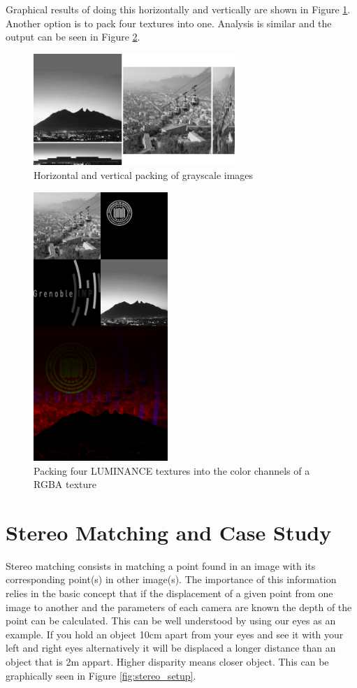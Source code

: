 \documentclass[conference]{IEEEtran}
\begin{document}
\begin{itemize}
Graphical results of doing this horizontally and vertically are shown in Figure \ref{fig:hor_ver_packing}. Another option is to pack four textures into one. Analysis is similar and the output can be seen in Figure \ref{fig:gray2color_packing}.
\end{itemize}

\begin{figure}[!t]
	\centering
	\includegraphics[width=3.0in]{hor_ver_packing}
	\caption{Horizontal and vertical packing of grayscale images}
	\label{fig:hor_ver_packing}
\end{figure}

\begin{figure}[!t]
	\centering
	\includegraphics[width=2.0in]{gray2color_packing}
	\caption{Packing four LUMINANCE textures into the color channels of a RGBA texture}
	\label{fig:gray2color_packing}
\end{figure}


\section{Stereo Matching and Case Study}
Stereo matching consists in matching a point found in an image with its corresponding point(s) in other image(s). The importance of this information relies in the basic concept that if the displacement of a given point from one image to another and the parameters of each camera are known the depth of the point can be calculated. This can be well understood by using our eyes as an example. If you hold an object 10cm apart from your eyes and see it with your left and right eyes alternatively it will be displaced a longer distance than an object that is 2m appart. Higher disparity means closer object. This can be graphically seen in Figure \ref{fig:stereo_setup}.
\end{document}
